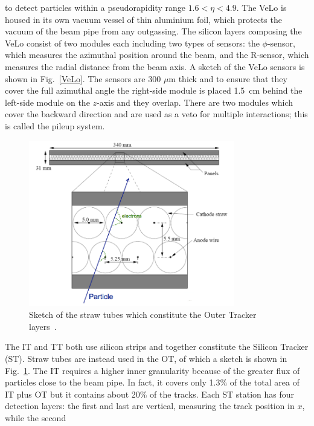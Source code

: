 to detect particles within a pseudorapidity range $1.6 < \eta < 4.9$. The VeLo is housed in its own
vacuum vessel of thin aluminium foil, which protects the vacuum of the beam pipe from any outgassing. 
The silicon layers composing the VeLo consist of two modules each including two types of sensors:
the $\phi$-sensor, which measures the azimuthal position around the beam, and the R-sensor, which measures
the radial distance from the beam axis. A sketch of the VeLo sensors is shown in Fig.~\ref{VeLo}. The sensors
are 300 $\mu$m thick and to ensure that they cover the full azimuthal angle the right-side module is placed
1.5~cm behind the left-side module on the $z$-axis and they overlap. There are two modules which cover the
backward direction and are used as a veto for multiple interactions; this is called the pileup system.
%
\begin{center}
\begin{figure}[h!]
\centering 
\includegraphics[width=0.8\textwidth]{Detector/figs/straw_tubes.png}
\caption{Sketch of the straw tubes which constitute the Outer Tracker layers~\cite{Alves:2008zz}.}
\label{fig:straw:tubes}
\end{figure}
\end{center}
%
The IT and TT both use silicon strips and together constitute the Silicon Tracker (ST). Straw tubes are instead used 
in the OT, of which a sketch is shown in Fig.~\ref{fig:straw:tubes}. The IT requires a higher inner granularity
because of the greater flux of particles close to the beam pipe. In fact, it covers only 1.3\% of the total
area of IT plus OT but it contains about 20\% of the tracks. Each ST station has four detection layers:
the first and last are vertical, measuring the track position in $x$, while the second 
